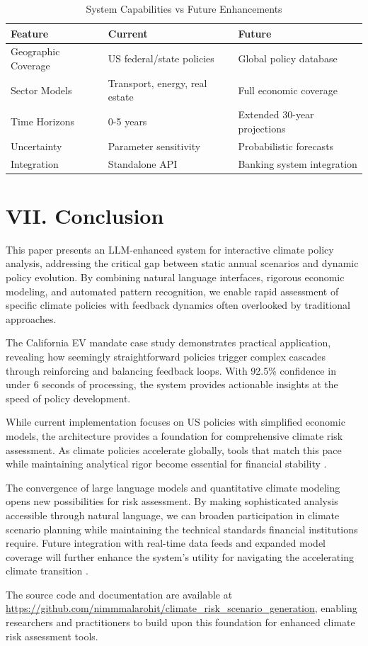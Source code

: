 \documentclass[10pt,twocolumn]{article}
\begin{document}
\begin{table}[!htb]
\centering
\caption{System Capabilities vs Future Enhancements}
\label{tab:capabilities}
\scriptsize
\begin{tabular}{p{2.2cm}p{2.2cm}p{2.2cm}}
\toprule
\textbf{Feature} & \textbf{Current} & \textbf{Future} \\
\midrule
Geographic Coverage & US federal/state policies & Global policy database \\
Sector Models & Transport, energy, real estate & Full economic coverage \\
Time Horizons & 0-5 years & Extended 30-year projections \\
Uncertainty & Parameter sensitivity & Probabilistic forecasts \\
Integration & Standalone API & Banking system integration \\
\bottomrule
\end{tabular}
\end{table}

\section{VII. Conclusion}

This paper presents an LLM-enhanced system for interactive climate policy analysis, addressing the critical gap between static annual scenarios and dynamic policy evolution. By combining natural language interfaces, rigorous economic modeling, and automated pattern recognition, we enable rapid assessment of specific climate policies with feedback dynamics often overlooked by traditional approaches.

The California EV mandate case study demonstrates practical application, revealing how seemingly straightforward policies trigger complex cascades through reinforcing and balancing feedback loops. With 92.5\% confidence in under 6 seconds of processing, the system provides actionable insights at the speed of policy development.

While current implementation focuses on US policies with simplified economic models, the architecture provides a foundation for comprehensive climate risk assessment. As climate policies accelerate globally, tools that match this pace while maintaining analytical rigor become essential for financial stability \citep{feridun2020climate, zhang2021investor}.

The convergence of large language models and quantitative climate modeling opens new possibilities for risk assessment. By making sophisticated analysis accessible through natural language, we can broaden participation in climate scenario planning while maintaining the technical standards financial institutions require. Future integration with real-time data feeds and expanded model coverage will further enhance the system's utility for navigating the accelerating climate transition \citep{roncalli2021market, sankar2024carbon, wang2022moment}.

The source code and documentation are available at \url{https://github.com/nimmmalarohit/climate_risk_scenario_generation}, enabling researchers and practitioners to build upon this foundation for enhanced climate risk assessment tools.



\end{document}
